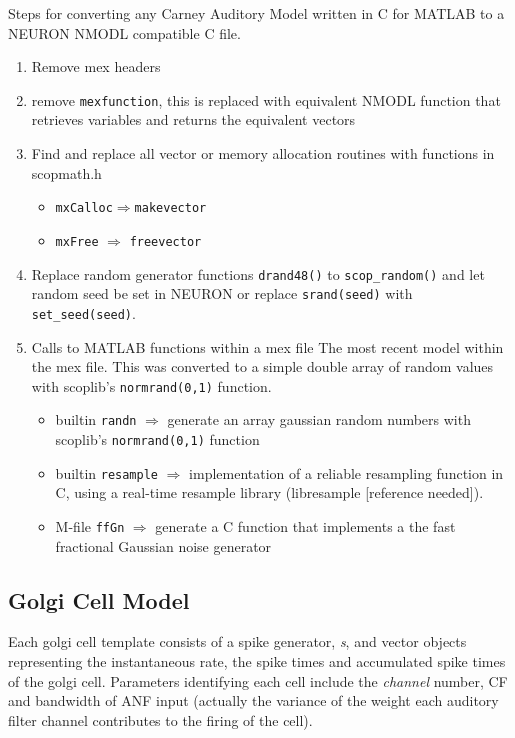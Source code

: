 \begin{appendix}
\medskip{}

Steps for converting any Carney Auditory Model written in C for
MATLAB to a NEURON NMODL compatible C file.  
\begin{enumerate} 
\item Remove mex headers 
\item remove \texttt{mexfunction}, this is
  replaced with equivalent NMODL function that retrieves variables and
  returns the equivalent vectors
\item Find and replace all vector or memory allocation routines with functions
  in scopmath.h
\begin{itemize} 
\item \texttt{mxCalloc}$\Rightarrow$\texttt{makevector}
\item \texttt{mxFree} $\Rightarrow$ \texttt{freevector}
\end{itemize} 
\item Replace random generator functions \texttt{drand48()} to
  \texttt{scop\_random()} and let random seed be set in NEURON or replace \texttt{srand(seed)} with
  \texttt{set\_seed(seed)}. 
\item Calls to MATLAB functions within a mex file The most recent model  within the mex file.  This was
  converted to a simple double array of random values with scoplib's
  \texttt{normrand(0,1)} function.
\begin{itemize}
\item builtin \texttt{randn} $\Rightarrow$ generate an array gaussian random numbers with scoplib's
  \texttt{normrand(0,1)} function
\item builtin \texttt{resample} $\Rightarrow$ implementation of a reliable resampling function in C, using
  a real-time resample library (libresample [reference needed]).
\item M-file \texttt{ffGn}  $\Rightarrow$ generate a C function that implements a the fast fractional Gaussian noise generator
\end{itemize}

\end{enumerate}





\subsection{Golgi Cell Model}

Each golgi cell template consists of a spike generator, \emph{s}, and vector
objects representing the instantaneous rate, the spike times and
accumulated  spike times of the golgi cell. Parameters identifying
each cell include the \emph{channel} number, CF and bandwidth of ANF
input (actually the variance of the weight each auditory filter
channel contributes to the firing of the cell).


\end{appendix}
